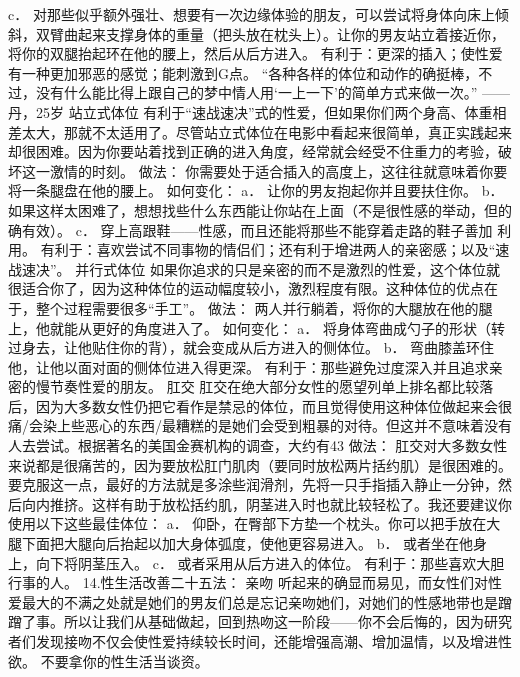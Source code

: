 \documentclass[12pt,UTF8,openany]{ctexbook}
\begin{document}
c． 对那些似乎额外强壮、想要有一次边缘体验的朋友，可以尝试将身体向床上倾斜，双臂曲起来支撑身体的重量（把头放在枕头上）。让你的男友站立着接近你，将你的双腿抬起环在他的腰上，然后从后方进入。
有利于：更深的插入；使性爱有一种更加邪恶的感觉；能刺激到G点。
“各种各样的体位和动作的确挺棒，不过，没有什么能比得上跟自己的梦中情人用‘一上一下’的简单方式来做一次。”
——丹，25岁
站立式体位
有利于“速战速决”式的性爱，但如果你们两个身高、体重相差太大，那就不太适用了。尽管站立式体位在电影中看起来很简单，真正实践起来却很困难。因为你要站着找到正确的进入角度，经常就会经受不住重力的考验，破坏这一激情的时刻。
做法：
你需要处于适合插入的高度上，这往往就意味着你要将一条腿盘在他的腰上。
如何变化：
a． 让你的男友抱起你并且要扶住你。
b． 如果这样太困难了，想想找些什么东西能让你站在上面（不是很性感的举动，但的确有效）。
c． 穿上高跟鞋——性感，而且还能将那些不能穿着走路的鞋子善加 利用。
有利于：喜欢尝试不同事物的情侣们；还有利于增进两人的亲密感；以及“速战速决”。
并行式体位
如果你追求的只是亲密的而不是激烈的性爱，这个体位就很适合你了，因为这种体位的运动幅度较小，激烈程度有限。这种体位的优点在于，整个过程需要很多“手工”。
做法：
两人并行躺着，将你的大腿放在他的腿上，他就能从更好的角度进入了。
如何变化：
a． 将身体弯曲成勺子的形状（转过身去，让他贴住你的背），就会变成从后方进入的侧体位。
b． 弯曲膝盖环住他，让他以面对面的侧体位进入得更深。
有利于：那些避免过度深入并且追求亲密的慢节奏性爱的朋友。
肛交
肛交在绝大部分女性的愿望列单上排名都比较落后，因为大多数女性仍把它看作是禁忌的体位，而且觉得使用这种体位做起来会很痛/会染上些恶心的东西/最糟糕的是她们会受到粗暴的对待。但这并不意味着没有人去尝试。根据著名的美国金赛机构的调查，大约有43%
做法：
肛交对大多数女性来说都是很痛苦的，因为要放松肛门肌肉（要同时放松两片括约肌）是很困难的。要克服这一点，最好的方法就是多涂些润滑剂，先将一只手指插入静止一分钟，然后向内推挤。这样有助于放松括约肌，阴茎进入时也就比较轻松了。我还要建议你使用以下这些最佳体位：
a． 仰卧，在臀部下方垫一个枕头。你可以把手放在大腿下面把大腿向后抬起以加大身体弧度，使他更容易进入。
b． 或者坐在他身上，向下将阴茎压入。
c． 或者采用从后方进入的体位。
有利于：那些喜欢大胆行事的人。
14.性生活改善二十五法：
亲吻
听起来的确显而易见，而女性们对性爱最大的不满之处就是她们的男友们总是忘记亲吻她们，对她们的性感地带也是蹭蹭了事。所以让我们从基础做起，回到热吻这一阶段——你不会后悔的，因为研究者们发现接吻不仅会使性爱持续较长时间，还能增强高潮、增加温情，以及增进性欲。
不要拿你的性生活当谈资。
\end{document}
